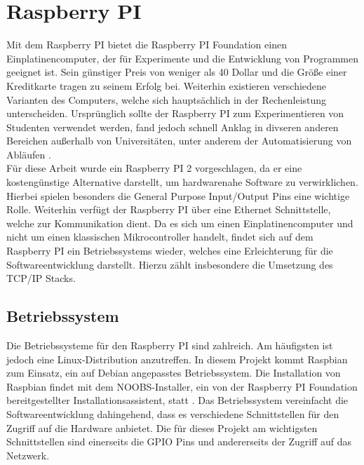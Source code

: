 \chapter{Raspberry PI}\label{raspi}
Mit dem Raspberry PI bietet die Raspberry PI Foundation einen Einplatinencomputer, der für Experimente und die Entwicklung von Programmen geeignet ist. Sein günstiger Preis von weniger als 40 Dollar und die Größe einer Kreditkarte tragen zu seinem Erfolg bei. Weiterhin existieren verschiedene Varianten des Computers, welche sich hauptsächlich in der Rechenleistung unterscheiden. Ursprünglich sollte der Raspberry PI zum Experimentieren von Studenten verwendet werden, fand jedoch schnell Anklag in divseren anderen Bereichen außerhalb von Universitäten, unter anderem der Automatisierung von Abläufen \cite{raspiabout}.\\
Für diese Arbeit wurde ein Raspberry PI 2 vorgeschlagen, da er eine kostengünstige Alternative darstellt, um hardwarenahe Software zu verwirklichen. Hierbei spielen besonders die General Purpose Input/Output Pins eine wichtige Rolle. Weiterhin verfügt der Raspberry PI über eine Ethernet Schnittstelle, welche zur Kommunikation dient. Da es sich um einen Einplatinencomputer und nicht um einen klassischen Mikrocontroller handelt, findet sich auf dem Raspberry PI ein Betriebssystems wieder, welches eine Erleichterung für die Softwareentwicklung darstellt. Hierzu zählt insbesondere die Umsetzung des TCP/IP Stacks.

\section{Betriebssystem}\label{os}
Die Betriebssysteme für den Raspberry PI sind zahlreich. Am häufigsten ist jedoch eine Linux-Distribution anzutreffen. In diesem Projekt kommt Raspbian zum Einsatz, ein auf Debian angepasstes Betriebssystem. Die Installation von Raspbian findet mit dem NOOBS-Installer, ein von der Raspberry PI Foundation bereitgestellter Installationsassistent, statt \cite{raspinoobs}. 
Das Betriebssystem vereinfacht die Softwareentwicklung dahingehend, dass es verschiedene Schnittstellen für den Zugriff auf die Hardware anbietet. Die für dieses Projekt am wichtigsten Schnittstellen sind einerseits die GPIO Pins und andererseits der Zugriff auf das Netzwerk.

